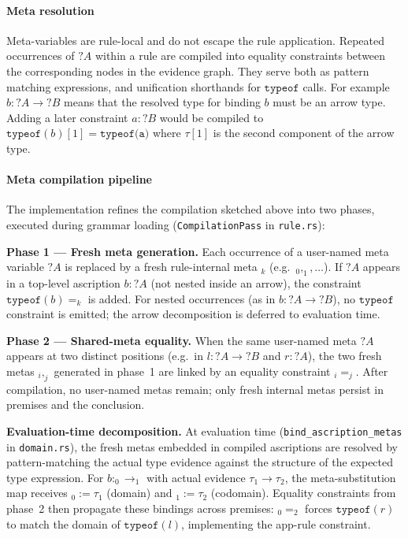 \paragraph{Meta resolution} Meta-variables are rule-local and do not escape the rule application. Repeated occurrences of $?A$ within a rule are compiled into equality constraints between the corresponding nodes in the evidence graph. They serve both as pattern matching expressions, and unification shorthands for $\texttt{typeof}$ calls. For example $b : ?A \to ?B$ means that the resolved type for binding $b$ must be an arrow type. Adding a later constraint $a : ?B$ would be compiled to $\texttt{typeof}(b)[1] = \texttt{typeof(a)}$ where $\tau[1]$ is the second component of the arrow type.

\paragraph{Meta compilation pipeline}
\label{sec:meta-compilation}
The implementation refines the compilation sketched above into two phases, executed during
grammar loading (\texttt{CompilationPass} in \texttt{rule.rs}):

\textbf{Phase 1 — Fresh meta generation.}
Each occurrence of a user-named meta variable $?A$ is replaced by a fresh
rule-internal meta $_k$ (e.g.\ $_0, _1, \ldots$).
If $?A$ appears in a top-level ascription $b : ?A$ (not nested inside an
arrow), the constraint $\texttt{typeof}(b) = _k$ is added.
For nested occurrences (as in $b : ?A \to ?B$), no $\texttt{typeof}$ constraint
is emitted; the arrow decomposition is deferred to evaluation time.

\textbf{Phase 2 — Shared-meta equality.}
When the same user-named meta $?A$ appears at two distinct positions (e.g.\
in $l : ?A \to ?B$ and $r : ?A$), the two fresh metas $_i, _j$ generated in
phase~1 are linked by an equality constraint $_i = _j$.
After compilation, no user-named metas remain; only fresh internal metas
persist in premises and the conclusion.

\textbf{Evaluation-time decomposition.}
At evaluation time (\texttt{bind\_ascription\_metas} in \texttt{domain.rs}),
the fresh metas embedded in compiled ascriptions are resolved by pattern-matching
the actual type evidence against the structure of the expected type expression.
For $b : _0 \to _1$ with actual evidence $\tau_1 \to \tau_2$, the
meta-substitution map receives $_0 := \tau_1$ (domain) and $_1 := \tau_2$
(codomain).
Equality constraints from phase~2 then propagate these bindings across
premises: $_0 = _2$ forces $\texttt{typeof}(r)$ to match the domain of
$\texttt{typeof}(l)$, implementing the app-rule constraint.

